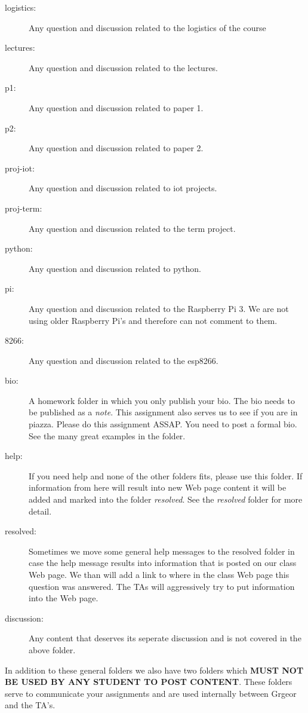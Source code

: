 \begin{description}
\item[logistics:]
Any question and discussion related to the logistics of the course
\item[lectures:]
Any question and discussion related to the lectures.
\item[p1:]
Any question and discussion related to paper 1.
\item[p2:]
Any question and discussion related to paper 2.
\item[proj-iot:]
Any question and discussion related to iot projects.
\item[proj-term:]
Any question and discussion related to the term project.
\item[python:]
Any question and discussion related to python.
\item[pi:]
Any question and discussion related to the Raspberry Pi 3. We are not
using older Raspberry Pi's and therefore can not comment to them.
\item[8266:]
Any question and discussion related to the esp8266.
\item[bio:]
A homework folder in which you only publish your bio. The bio needs to
be published as a \emph{note}. This assignment also serves us to see if
you are in piazza. Please do this assignment ASSAP. You need to post a
formal bio. See the many great examples in the folder.
\item[help:]
If you need help and none of the other folders fits, please use this
folder. If information from here will result into new Web page content
it will be added and marked into the folder \emph{resolved}. See the
\emph{resolved} folder for more detail.
\item[resolved:]
Sometimes we move some general help messages to the resolved folder in
case the help message results into information that is posted on our
class Web page. We than will add a link to where in the class Web page
this question was answered. The TAs will aggressively try to put
information into the Web page.
\item[discussion:]
Any content that deserves its seperate discussion and is not covered in
the above folder.
\end{description}

In addition to these general folders we also have two folders which
\textbf{MUST NOT BE USED BY ANY STUDENT TO POST CONTENT}. These folders
serve to communicate your assignments and are used internally between
Grgeor and the TA's.

